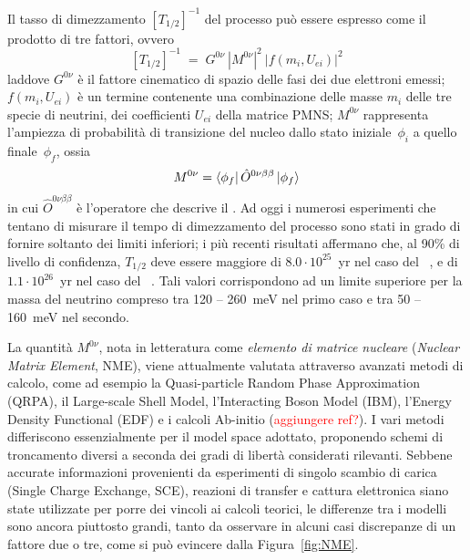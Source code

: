 Il tasso di dimezzamento $ \left[ T_{1/2} \right]^{-1} $ del processo può essere espresso come il prodotto di tre fattori, ovvero
\begin{equation} \label{eq:rate_doppio_beta}
	\left[ T_{1/2} \right]^{-1} \; = \; G^{0 \nu} \: \left| M^{0 \nu} \right|^2 \: \left| f ( m_i, U_{ei}) \right|^2 
\end{equation}
laddove $G^{0 \nu}$ è il fattore cinematico di spazio delle fasi dei due elettroni emessi; $ f ( m_i, U_{ei}) $ è un termine contenente una combinazione delle masse $m_i$ delle tre specie di neutrini, dei coefficienti $U_{ei}$ della matrice PMNS; $M^{0 \nu}$ rappresenta l'ampiezza di probabilità di transizione del nucleo dallo stato iniziale~$\phi_i$ a quello finale~$\phi_f$, ossia
\begin{equation}
	M^{0 \nu} = \bra{\phi_f} \hat{O}^{0 \nu \beta \beta} \ket{\phi_f} 
\end{equation}
in cui $\hat{O}^{0 \nu \beta \beta}$ è l'operatore che descrive il \doppiobeta{}. 
Ad oggi i numerosi esperimenti che tentano di misurare il tempo di dimezzamento del processo sono stati in grado di fornire soltanto dei limiti inferiori; i più recenti risultati affermano che, al 90\% di livello di confidenza, $T_{1/2}$ deve essere maggiore di $8.0 \cdot 10^{25}$~yr nel caso del ~\cite{agostini:prl18}, e di $1.1 \cdot 10^{26}$~yr nel caso del ~\cite{gando:prl16}. Tali valori corrispondono ad un limite superiore per la massa del neutrino compreso tra 120 -- 260~meV nel primo caso e tra 50 -- 160~meV nel secondo.




La quantità $M^{0 \nu}$, nota in letteratura come \emph{elemento di matrice nucleare} (\emph{Nuclear Matrix Element}, NME), viene attualmente valutata attraverso avanzati metodi di calcolo, come ad esempio la Quasi-particle Random Phase Approximation (QRPA), il Large-scale Shell Model, l'Interacting Boson Model (IBM), l'Energy Density Functional (EDF) e i calcoli Ab-initio (\textcolor{red}{aggiungere ref?}). I vari metodi differiscono essenzialmente per il model space adottato, proponendo schemi di troncamento diversi a seconda dei gradi di libertà considerati rilevanti. 
Sebbene accurate informazioni provenienti da esperimenti di singolo scambio di carica (Single Charge Exchange, SCE), reazioni di transfer e cattura elettronica siano state utilizzate per porre dei vincoli ai calcoli teorici, le differenze tra i modelli sono ancora piuttosto grandi, tanto da osservare in alcuni casi discrepanze di un fattore due o tre, come si può evincere dalla Figura~\ref{fig:NME}. 

